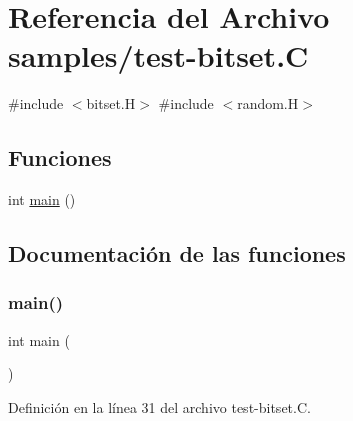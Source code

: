 \hypertarget{test-bitset_8_c}{}\section{Referencia del Archivo samples/test-\/bitset.C}
\label{test-bitset_8_c}
{\ttfamily \#include $<$bitset.\+H$>$}\newline
{\ttfamily \#include $<$random.\+H$>$}\newline
\subsection*{Funciones}
\begin{DoxyCompactItemize}
\item 
int \hyperlink{test-bitset_8_c_ae66f6b31b5ad750f1fe042a706a4e3d4}{main} ()
\end{DoxyCompactItemize}


\subsection{Documentación de las funciones}
\mbox{\label{test-bitset_8_c_ae66f6b31b5ad750f1fe042a706a4e3d4}} 
\subsubsection{\texorpdfstring{main()}{main()}}
{\footnotesize\ttfamily int main (\begin{DoxyParamCaption}{ }\end{DoxyParamCaption})}



Definición en la línea 31 del archivo test-\/bitset.\+C.

